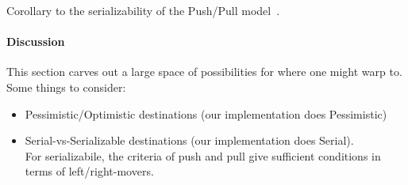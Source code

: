\begin{theorem}[Serializability]
Corollary to the serializability of the Push/Pull model~\cite{pmpy}.
\end{theorem}


\paragraph{Discussion}

This section carves out a large space of possibilities for where one
might warp to. Some things to consider:

\begin{itemize}
\item Pessimistic/Optimistic destinations 
  (our implementation does Pessimistic)
\item Serial-vs-Serializable destinations
  (our implementation does Serial).\\
  For serializabile, the criteria of {\sc push} and {\sc pull} give
  sufficient conditions in terms of left/right-movers.
\end{itemize}




